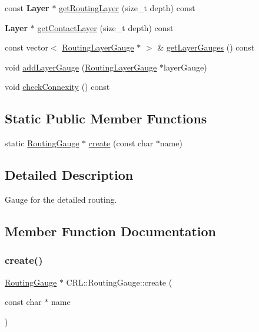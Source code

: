 \begin{DoxyCompactItemize}
\item 
const \textbf{ Layer} $\ast$ \mbox{\hyperlink{classCRL_1_1RoutingGauge_a6d6c1951c8728886d3fb702891685b94}{get\+Routing\+Layer}} (size\+\_\+t depth) const
\item 
\textbf{ Layer} $\ast$ \mbox{\hyperlink{classCRL_1_1RoutingGauge_a4b603c0fd5f21db1c93d8a747ec1f4ba}{get\+Contact\+Layer}} (size\+\_\+t depth) const
\item 
const vector$<$ \mbox{\hyperlink{classCRL_1_1RoutingLayerGauge}{Routing\+Layer\+Gauge}} $\ast$ $>$ \& \mbox{\hyperlink{classCRL_1_1RoutingGauge_ae8cebef061519fb2df94e3a9dcf09e6e}{get\+Layer\+Gauges}} () const
\item 
void \mbox{\hyperlink{classCRL_1_1RoutingGauge_a32313fbc68080e0b7e03b3e06dc1d9c5}{add\+Layer\+Gauge}} (\mbox{\hyperlink{classCRL_1_1RoutingLayerGauge}{Routing\+Layer\+Gauge}} $\ast$layer\+Gauge)
\item 
void \mbox{\hyperlink{classCRL_1_1RoutingGauge_ae76259fdd9d27d1127ac201c41ab8c20}{check\+Connexity}} () const
\end{DoxyCompactItemize}
\subsection*{Static Public Member Functions}
\begin{DoxyCompactItemize}
\item 
static \mbox{\hyperlink{classCRL_1_1RoutingGauge}{Routing\+Gauge}} $\ast$ \mbox{\hyperlink{classCRL_1_1RoutingGauge_a7258273728f5db47e422d5914c1c36bd}{create}} (const char $\ast$name)
\end{DoxyCompactItemize}


\subsection{Detailed Description}
Gauge for the detailed routing. 

\subsection{Member Function Documentation}
\mbox{\label{classCRL_1_1RoutingGauge_a7258273728f5db47e422d5914c1c36bd}} 
\subsubsection{\texorpdfstring{create()}{create()}}
{\footnotesize\ttfamily \mbox{\hyperlink{classCRL_1_1RoutingGauge}{Routing\+Gauge}} $\ast$ C\+R\+L\+::\+Routing\+Gauge\+::create (\begin{DoxyParamCaption}\item[{const char $\ast$}]{name }\end{DoxyParamCaption})\hspace{0.3cm}{\ttfamily [static]}}

